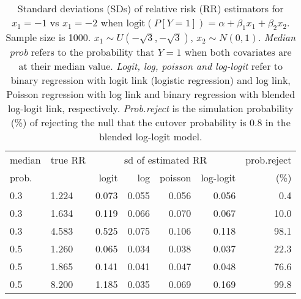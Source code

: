 \documentclass[12pt,a4paper]{article}
\begin{document}
\begin{table}[H] 
\small\sf\centering 
\caption{Standard deviations (SDs) of relative risk (RR) estimators for $x_1=-1$ vs $x_1=-2$ when $\mbox{logit}(P[Y=1])=\alpha+\beta_1 x_1 + \beta_2 x_2$. Sample size is 1000. $x_1 \sim $$U(-\sqrt{3},-\sqrt{3})$, $x_2 \sim N(0,1)$. {\it Median prob} refers to the probability that $Y=1$ when both covariates are at their median value. {\it Logit, log, poisson and log-logit} refer to binary regression with logit link (logistic regression) and log link, Poisson regression with log link and binary regression with blended log-logit link, respectively. {\it Prob.reject} is the simulation probability (\%) of rejecting the null that the cutover probability is $0.8$ in the blended log-logit model.} 
\begin{tabular}{llrrrrr} 
\toprule 
median & true RR & \multicolumn{4}{c}{sd of estimated RR} & prob.reject \\ 
prob. & & logit & log & poisson & log-logit  & (\%) \\ \midrule 
0.3 & 1.224 & 0.073 & 0.055 & 0.056 & 0.056 &  0.4 \\  
0.3 & 1.634 & 0.119 & 0.066 & 0.070 & 0.067 & 10.0 \\  
0.3 & 4.583 & 0.525 & 0.075 & 0.106 & 0.118 & 98.1 \\  
0.5 & 1.260 & 0.065 & 0.034 & 0.038 & 0.037 & 22.3 \\  
0.5 & 1.865 & 0.141 & 0.041 & 0.047 & 0.048 & 76.6 \\  
0.5 & 8.200 & 1.185 & 0.035 & 0.069 & 0.169 & 99.8 \\  
\bottomrule 
\end{tabular} 
\end{table} 
\end{document}
